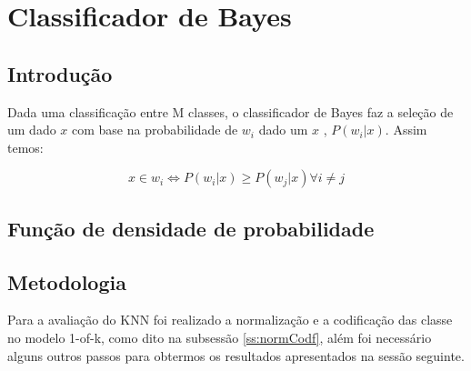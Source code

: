 \documentclass[ 
	article,			%
	11pt,				%
	oneside,			%
	a4paper,			%
	english,			%
	brazil,				%
	]{abntex2}
\begin{document}
%  
% 
% 
% 



\section{Classificador de Bayes}

\subsection{Introdução}
Dada uma classificação entre M classes, o classificador de Bayes faz a seleção
de um dado $x$ com base na probabilidade de $w_i$ dado um $x$ , $P(w_i|x)$.
Assim temos:


\begin{equation}
	x \in w_i \iff P(w_i|x) \geq P(w_j|x) \forall i \neq j
\end{equation}

\subsection{Função de densidade de probabilidade} 
\subsection{Metodologia}
\label{ss:metAplKnn}

Para a avaliação do KNN foi realizado a normalização e a codificação das classe
no modelo 1-of-k, como dito na subsessão \ref{ss:normCodf}, além foi necessário
alguns outros passos para obtermos os resultados apresentados na sessão
seguinte.
\end{document}
